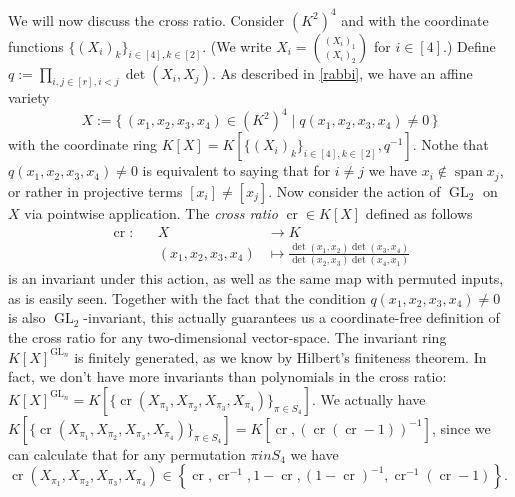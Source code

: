 \begin{example}
  We will now discuss the cross ratio.
  Consider $(K^2)^4$ and with the coordinate functions $\{(X_i)_k\}_{i \in [4], k \in [2]}$.
  (We write $X_i = \binom{(X_i)_1}{(X_i)_2}$ for $i \in [4]$.)
  Define $q := \prod_{i,j \in [r], i<j} \operatorname{det}(X_i,X_j)$.
  As described in \ref{rabbi}, we have an affine variety
  \begin{equation}
    X := \{\, (x_1,x_2,x_3,x_4) \in (K^2)^4 \mid q(x_1,x_2,x_3,x_4) \neq 0 \,\}
  \end{equation}
  with the coordinate ring $K[X] = K[\{(X_i)_k\}_{i \in [4], k \in [2]},q^{-1}]$.
  Nothe that $q(x_1,x_2,x_3,x_4) \neq 0$ is equivalent to saying that for $i\neq j$ we have $x_i \notin \operatorname{span}{x_j}$, or rather in projective terms $[x_i] \neq [x_j]$.
  Now consider the action of $\operatorname{GL}_2$ on $X$ via pointwise application.
  The \textit{cross ratio} $\operatorname{cr} \in K[X]$ defined as follows
  \begin{equation}
    \begin{aligned}
      \operatorname{cr} \colon&&X&\longrightarrow K \\
      &&(x_1,x_2,x_3,x_4) &\longmapsto \frac{\operatorname{det}(x_1,x_2)\operatorname{det}(x_3,x_4)}{\operatorname{det}(x_2,x_3)\operatorname{det}(x_4,x_1)}
    \end{aligned}
  \end{equation}
  is an invariant under this action, as well as the same map with permuted inputs, as is easily seen.
  Together with the fact that the condition $q(x_1,x_2,x_3,x_4) \neq 0$ is also $\operatorname{GL}_2$-invariant, this actually guarantees us a coordinate-free definition of the cross ratio for any two-dimensional vector-space.
  The invariant ring $K[X]^{\operatorname{GL}_n}$ is finitely generated, as we know by Hilbert's finiteness theorem.
  In fact, we don't have more invariants than polynomials in the cross ratio: $K[X]^{\operatorname{GL}_n} = K[\{\operatorname{cr}(X_{\pi_1},X_{\pi_2},X_{\pi_3},X_{\pi_4})\}_{\pi \in S_4}]$.
  We actually have $K[\{\operatorname{cr}(X_{\pi_1},X_{\pi_2},X_{\pi_3},X_{\pi_4})\}_{\pi \in S_4}] = K[\operatorname{cr},(\operatorname{cr}(\operatorname{cr} -1))^{-1}] $, since we can calculate that for any permutation $\pi in S_4$ we have $ \operatorname{cr}(X_{\pi_1},X_{\pi_2},X_{\pi_3},X_{\pi_4}) \in \left\{ \operatorname{cr}, \operatorname{cr}^{-1}, 1 - \operatorname{cr}, (1-\operatorname{cr})^{-1}, \operatorname{cr}^{-1}(\operatorname{cr}-1)\right\}$.

\end{example}
